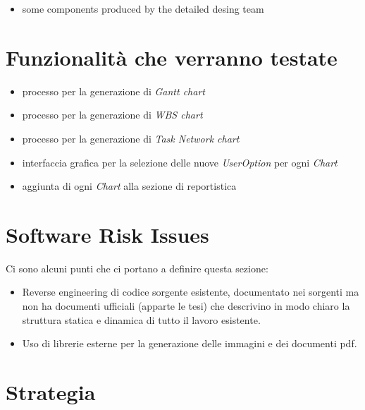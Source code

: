 \begin{itemize}
  \item some components produced by the detailed desing team
\end{itemize}

\section{Funzionalit\`a che verranno testate}
\begin{itemize}
  \item processo per la generazione di \emph{Gantt chart}
  \item processo per la generazione di \emph{WBS chart}
  \item processo per la generazione di \emph{Task Network chart}
  \item interfaccia grafica per la selezione delle nuove \emph{UserOption} per
  ogni \emph{Chart}
  \item aggiunta di ogni \emph{Chart} alla sezione di reportistica
\end{itemize}

\section{Software Risk Issues}
Ci sono alcuni punti che ci portano a definire questa sezione:
\begin{itemize}
  \item Reverse engineering di codice sorgente esistente, documentato nei sorgenti
ma non ha documenti ufficiali (apparte le tesi) che descrivino in modo chiaro
la struttura statica e dinamica di tutto il lavoro esistente.
  \item Uso di librerie esterne per la generazione delle immagini e dei
  documenti pdf.
\end{itemize}

\section{Strategia}


